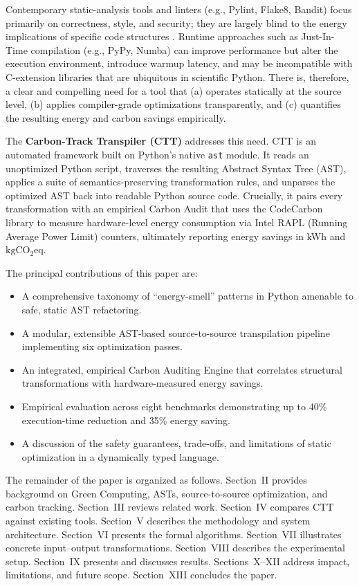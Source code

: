 \documentclass[conference]{IEEEtran}
\begin{document}
Contemporary static-analysis tools and linters (e.g., Pylint, Flake8,
Bandit) focus primarily on correctness, style, and security; they are
largely blind to the energy implications of specific code structures
\cite{ref6}.  Runtime approaches such as Just-In-Time compilation (e.g., PyPy,
Numba) can improve performance but alter the execution environment, introduce
warmup latency, and may be incompatible with C-extension libraries that are
ubiquitous in scientific Python.  There is, therefore, a clear and compelling
need for a tool that (a) operates statically at the source level, (b) applies
compiler-grade optimizations transparently, and (c) quantifies the resulting
energy and carbon savings empirically.

The \textbf{Carbon-Track Transpiler (CTT)} addresses this need.  CTT is an
automated framework built on Python's native \texttt{ast} module.  It reads
an unoptimized Python script, traverses the resulting Abstract Syntax Tree
(AST), applies a suite of semantics-preserving transformation rules, and
unparses the optimized AST back into readable Python source code.  Crucially,
it pairs every transformation with an empirical Carbon Audit that uses the
CodeCarbon library \cite{ref9} to measure hardware-level energy consumption
via Intel RAPL (Running Average Power Limit) counters, ultimately reporting
energy savings in kWh and $\mathrm{kgCO_2eq}$.

The principal contributions of this paper are:
\begin{itemize}
  \item A comprehensive taxonomy of ``energy-smell'' patterns in Python
        amenable to safe, static AST refactoring.
  \item A modular, extensible AST-based source-to-source transpilation
        pipeline implementing six optimization passes.
  \item An integrated, empirical Carbon Auditing Engine that correlates
        structural transformations with hardware-measured energy savings.
  \item Empirical evaluation across eight benchmarks demonstrating up to
        40\% execution-time reduction and 35\% energy saving.
  \item A discussion of the safety guarantees, trade-offs, and limitations
        of static optimization in a dynamically typed language.
\end{itemize}

The remainder of the paper is organized as follows.  Section~II provides
background on Green Computing, ASTs, source-to-source optimization, and
carbon tracking.  Section~III reviews related work.  Section~IV compares
CTT against existing tools.  Section~V describes the methodology and system
architecture.  Section~VI presents the formal algorithms.  Section~VII
illustrates concrete input--output transformations.  Section~VIII describes
the experimental setup.  Section~IX presents and discusses results.
Sections~X--XII address impact, limitations, and future scope.
Section~XIII concludes the paper.
\end{document}
